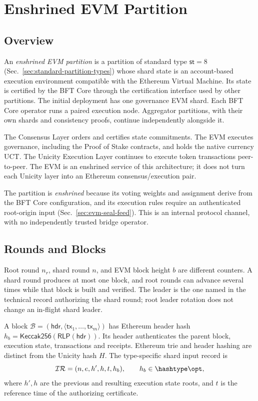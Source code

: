 \chapter{Enshrined EVM Partition}\label{ch:evm}

\section{Overview}

An \emph{enshrined EVM partition} is a partition of standard type $\mathsf{st}=8$ (Sec.~\ref{sec:standard-partition-types}) whose shard state is an account-based execution environment compatible with the Ethereum Virtual Machine. Its state is certified by the BFT Core through the certification interface used by other partitions. The initial deployment has one governance EVM shard. Each BFT Core operator runs a paired execution node. Aggregator partitions, with their own shards and consistency proofs, continue independently alongside it.

The Consensus Layer orders and certifies state commitments. The EVM executes governance, including the Proof of Stake contracts, and holds the native currency UCT. The Unicity Execution Layer continues to execute token transactions peer-to-peer. The EVM is an enshrined service of this architecture; it does not turn each Unicity layer into an Ethereum consensus/execution pair.

The partition is \emph{enshrined} because its voting weights and assignment derive from the BFT Core configuration, and its execution rules require an authenticated root-origin input (Sec.~\ref{sec:evm-seal-feed}). This is an internal protocol channel, with no independently trusted bridge operator.

\section{Rounds and Blocks}\label{sec:evm-rounds}

Root round $n_r$, shard round $n$, and EVM block height $b$ are different counters. A shard round produces at most one block, and root rounds can advance several times while that block is built and verified. The leader is the one named in the technical record authorizing the shard round; root leader rotation does not change an in-flight shard leader.

A block $\mathcal{B}=(\mathsf{hdr},\langle\mathsf{tx}_1,\ldots,\mathsf{tx}_m\rangle)$ has Ethereum header hash $h_b=\mathsf{Keccak256}(\mathsf{RLP}(\mathsf{hdr}))$. Its header authenticates the parent block, execution state, transactions and receipts. Ethereum trie and header hashing are distinct from the Unicity hash $H$. The type-specific shard input record is
\[
 \mathcal{IR}=(n,e,h',h,t,h_b),\qquad h_b\in\hashtype\opt,
\]
where $h',h$ are the previous and resulting execution state roots, and $t$ is the reference time of the authorizing certificate.

